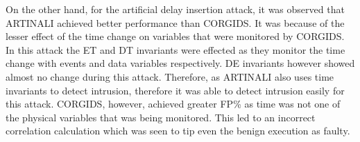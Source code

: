 On the other hand, for the artificial delay insertion attack, it was observed that ARTINALI achieved better performance than \ac{CORGIDS}. It was because of the lesser effect of the time change on variables that were monitored by \ac{CORGIDS}. In this attack the E\textbar T and D\textbar T invariants were effected as they monitor the time change with events and data variables respectively. D\textbar E invariants however showed almost no change during this attack. Therefore, as ARTINALI also uses time invariants to detect intrusion, therefore it was able to detect intrusion easily for this attack. \ac{CORGIDS}, however, achieved greater \ac{FP}\% as time was not one of the physical variables that was being monitored. This led to an incorrect correlation calculation which was seen to tip even the benign execution as faulty.



\endinput
